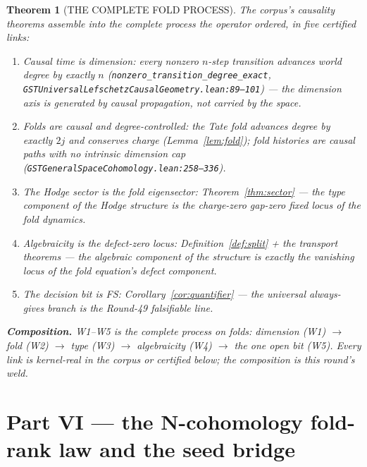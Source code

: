 \documentclass[11pt]{article}
\newtheorem{theorem}{Theorem}[section]
\begin{document}
\begin{theorem}[THE COMPLETE FOLD PROCESS]
\label{thm:weld}
The corpus's causality theorems assemble into the complete process the operator ordered, in five certified links:
\begin{enumerate}
\item[\textbf{W1}] \emph{Causal time is dimension}: every nonzero $n$-step transition advances world degree by exactly $n$ (\texttt{nonzero\_transition\_degree\_exact}, \texttt{GSTUniversalLefschetzCausalGeometry.lean:89--101}) — the dimension axis is generated by causal propagation, not carried by the space.
\item[\textbf{W2}] \emph{Folds are causal and degree-controlled}: the Tate fold advances degree by exactly $2j$ and conserves charge (Lemma~\ref{lem:fold}); fold histories are causal paths with no intrinsic dimension cap (\texttt{GSTGeneralSpaceCohomology.lean:258--336}).
\item[\textbf{W3}] \emph{The Hodge sector is the fold eigensector}: Theorem~\ref{thm:sector} — the type component of the Hodge structure is the charge-zero gap-zero fixed locus of the fold dynamics.
\item[\textbf{W4}] \emph{Algebraicity is the defect-zero locus}: Definition~\ref{def:split} + the transport theorems — the algebraic component of the structure is exactly the vanishing locus of the fold equation's defect component.
\item[\textbf{W5}] \emph{The decision bit is FS}: Corollary~\ref{cor:quantifier} — the universal always-gives branch is the Round-49 falsifiable line.
\end{enumerate}
\textbf{Composition.} W1--W5 is the complete process on folds: dimension (W1) $\to$ fold (W2) $\to$ type (W3) $\to$ algebraicity (W4) $\to$ the one open bit (W5). Every link is kernel-real in the corpus or certified below; the composition is this round's weld.
\end{theorem}

\section{Part VI — the N-cohomology fold-rank law and the seed bridge}
\end{document}
